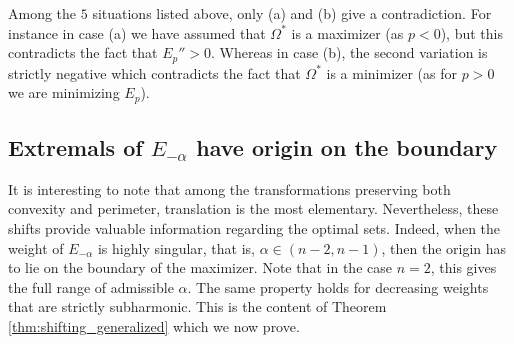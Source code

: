 \documentclass[10pt,leqno]{amsart}
\makeatletter
\numberwithin{Theorem}{section}
\theoremstyle{definition}
\theoremstyle{remark}
\numberwithin{equation}{section}
\numberwithin{equation}{section}
\newenvironment{customproof}[1]{%
  \par\pushQED{\qed}%
  \normalfont\topsep6pt \trivlist
  \item[\hskip\labelsep\itshape
    Proof of #1\@addpunct{.}]\ignorespaces
}{%
  \popQED\endtrivlist\@endpefalse
}
\makeatother
\begin{document}
\begin{customproof}{Theorem \ref{thm:nonempty_interior}}
Among the $5$ situations listed above, only (a) and (b) give a contradiction. For instance in  case (a) we have assumed that $\Omega^*$ is a maximizer (as $p<0$), but this contradicts the fact that $E_p''>0.$  Whereas in case (b), the second variation is strictly negative which contradicts the fact that $\Omega^*$ is a minimizer (as for $p>0$ we are minimizing $E_p$).



\end{customproof}



\subsection{Extremals of $E_{-\alpha}$ have origin on the boundary}\label{Sec:qualitative}


It is interesting to note that among the transformations preserving both convexity and perimeter, translation is the most elementary. Nevertheless, these shifts provide valuable information regarding the optimal sets. Indeed, when the weight of $E_{-\alpha}$ is highly singular, that is, $\alpha \in (n-2,n-1)$, then the origin has to lie on the boundary of the maximizer. Note that in the case $n=2$, this gives the full range of admissible $\alpha$. The same property holds for decreasing weights that are strictly subharmonic. This is the content of Theorem \ref{thm:shifting_generalized} which we now prove.
\end{document}
